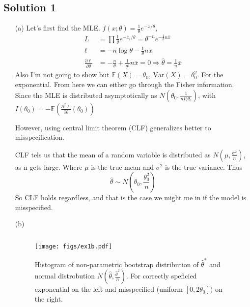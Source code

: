 \documentclass[a4paper,12pt]{article}
\theoremstyle{breaktheorem}
\theoremstyle{exerciseStyle}
\theoremstyle{solutionStyle}
\begin{document}
\subsection*{Solution 1}
\begin{enumerate}
    \item[(a)]
          Let's first find the MLE.
          $f(x; \theta) = \frac{1}{\theta} e^{- x/ \theta}$,
          \begin{align*}
              L                                     & = \prod \frac{1}{\theta}  e^{- x_i/ \theta} = \theta^{-n} e^{- \frac{1}{\theta} n \bar x}           \\
              \ell                                  & = -n \log \theta - \frac{1}{\theta} n \bar x                                                        \\
              \frac{\partial \ell}{\partial \theta} & = -\frac{n}{\theta} + \frac{1}{\theta^2} n \bar x = 0 \Rightarrow \hat{\theta} = \frac{1}{n} \bar x
          \end{align*}
          Also I'm not going to show but $\mathbb{E} (X) = \theta_0$, $\text{Var}(X) = \theta_0^2$. For the exponential.
          From here we can either go through the Fisher information. Since the MLE is distributed asymptotically
          as $N(\theta_0, \frac{1}{n I(\theta_0})$, with $I(\theta_0) = - \mathbb{E}(\frac{\partial^2 \ell}{\partial \theta} (\theta_0))$
          \par
          However, using central limit theorem (CLF) generalizes better to misspecification.

          CLF tels us that the mean of a random variable is distributed as $N(\mu, \frac{\sigma^2}{n})$, as n gets large. Where
          $\mu$ is the true mean and $\sigma^2$ is the true variance. Thus
          \[
              \hat{\theta} \sim N(\theta_0, \frac{\theta_0^2}{n})
          \]
          So CLF holds regardless, and that is the case we might me in if the model is misspecified.
    \item[(b)]
          \inputminted[linenos, breaklines, frame=lines]{python}{ex1b.py}
          \begin{figure}[h]
              \centering
              \texttt{[image: figs/ex1b.pdf]}
              \caption{Histogram of non-parametric bootstrap distribution of $\hat{\theta}^*$
                  and normal distrobution $N(\hat \theta, \frac{\hat \theta^2}{n})$.
                  For correctly speficied exponential on the left and misspecified (uniform $[0,2 \theta_0])$ on the right.}


\end{figure}
\end{enumerate}
\end{document}
